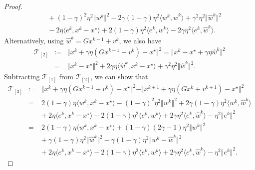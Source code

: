 \documentclass{article}
\newcommand{\norms}[1]{\Vert#1\Vert}
\newcommand{\iprods}[1]{\langle #1\rangle}
\newcommand{\Tc}{\mathcal{T}}
\theoremstyle{plain}
\theoremstyle{definition}
\theoremstyle{remark}
\begin{document}
\begin{proof}
\begin{equation*}
\begin{array}{lcl}
&& + {~}  (1-\gamma)^2\eta^2\norms{w^k}^2 - 2\gamma(1-\gamma)\eta^2\iprods{w^k, \hat{w}^k} + \gamma^2\eta^2\norms{\hat{w}^k}^2 \\
&& -  {~}  2\eta\iprods{e^k, x^k - x^{\star}}  + 2(1-\gamma)\eta^2 \iprods{e^k, w^k} - 2\gamma\eta^2 \iprods{e^k, \hat{w}^k}.
\end{array} 
\end{equation*}
Alternatively, using $\hat{w}^k = Gx^{k-1} + v^k$, we also have
\begin{equation*} 
\begin{array}{lcl}
\Tc_{[2]} &:= & \norms{x^k + \gamma \eta(Gx^{k-1} + v^k) - x^{\star}}^2 = \norms{x^k - x^{\star} + \gamma\eta\hat{w}^k }^2 \\
& = & \norms{x^k - x^{\star}}^2 + 2\gamma\eta\iprods{\hat{w}^k, x^k - x^{\star}} + \gamma^2\eta^2\norms{\hat{w}^k}^2.
\end{array} 
\end{equation*}
Subtracting $\Tc_{[1]}$ from $\Tc_{[2]}$, we can show that
\begin{equation}\label{eq:VROG4NI_key_bound_proof2} 
\begin{array}{lcl}
\Tc_{[3]} &:= & \norms{x^k + \gamma \eta(Gx^{k-1} + v^k) - x^{\star}}^2 - \norms{x^{k+1} + \gamma\eta(Gx^k + v^{k+1}) - x^{\star}}^2 \\
& = & 2(1-\gamma)\eta\iprods{w^k, x^k - x^{\star}} -  (1-\gamma)^2\eta^2\norms{w^k}^2 + 2\gamma(1-\gamma)\eta^2\iprods{w^k, \hat{w}^k} \\
&& +  {~}  2\eta\iprods{e^k, x^k - x^{\star}}  - 2(1-\gamma)\eta^2 \iprods{e^k, w^k} + 2\gamma\eta^2 \iprods{e^k, \hat{w}^k} - \eta^2\norms{e^k}^2 \\
& = & 2(1-\gamma)\eta \iprods{w^k, x^k - x^{\star}}  +  (1-\gamma)(2\gamma - 1) \eta^2 \norms{w^k}^2 \\
&& + {~}  \gamma(1-\gamma)\eta^2\norms{\hat{w}^k}^2 -  \gamma(1-\gamma)\eta^2\norms{w^k - \hat{w}^k}^2 \\
&& +  {~}  2\eta\iprods{e^k, x^k - x^{\star}}  - 2(1-\gamma)\eta^2 \iprods{e^k, w^k} + 2\gamma\eta^2 \iprods{e^k, \hat{w}^k} - \eta^2\norms{e^k}^2.

\end{array}
\end{equation}
\end{proof}
\end{document}
